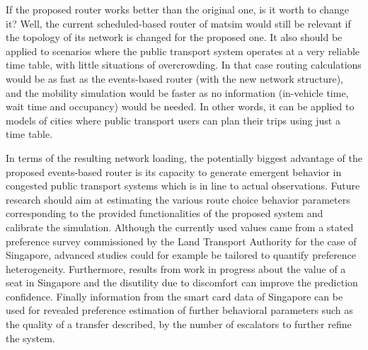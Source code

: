 If the proposed router works better than the original one, is it worth to change it? Well, the current scheduled-based router of \gls{matsim} would still be relevant if the topology of its network is changed for the proposed one. It also should be applied to scenarios where the public transport system operates at a very reliable time table, with little situations of overcrowding. In that case routing calculations would be as fast as the events-based router (with the new network structure), and the mobility simulation would be faster as no information (in-vehicle time, wait time and occupancy) would be needed. In other words, it can be applied to models of cities where public transport users can plan their trips using just a time table.

In terms of the resulting network loading, the potentially biggest advantage of the proposed events-based router is its capacity to generate emergent behavior in congested public transport systems which is in line to actual observations. Future research should aim at estimating the various route choice behavior parameters corresponding to the provided functionalities of the proposed system and calibrate the simulation. Although the currently used values came from a stated preference survey commissioned by the Land Transport Authority for the case of Singapore, advanced studies could for example be tailored to quantify preference heterogeneity. Furthermore, results from work in progress about the value of a seat in Singapore and the disutility due to discomfort can improve the prediction confidence. Finally information from the smart card data of Singapore can be used for revealed preference estimation of further behavioral parameters such as the quality of a transfer described, \eg by the number of escalators to further refine the system.





